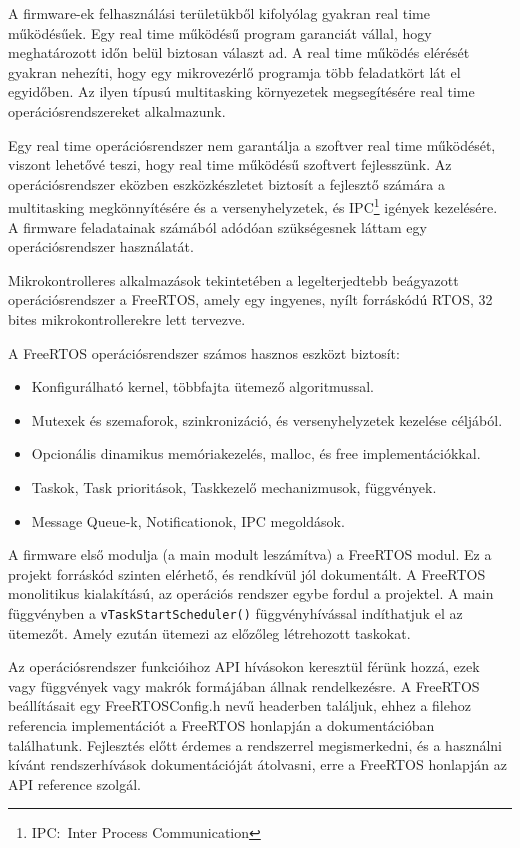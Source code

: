 A firmware-ek felhasználási területükből kifolyólag gyakran real time
működésűek. Egy real time működésű program garanciát vállal, hogy meghatározott
időn belül biztosan választ ad. A real time működés elérését gyakran
nehezíti, hogy egy mikrovezérlő programja több feladatkört lát el egyidőben. Az
ilyen típusú multitasking környezetek megsegítésére real time
operációsrendszereket alkalmazunk.

Egy real time operációsrendszer nem garantálja a szoftver real time működését,
viszont lehetővé teszi, hogy real time működésű szoftvert fejlesszünk. Az
operációsrendszer eközben eszközkészletet biztosít a fejlesztő számára
a multitasking megkönnyítésére és a versenyhelyzetek, és IPC\footnote{IPC:~Inter
Process Communication} igények kezelésére. A firmware feladatainak
számából adódóan szükségesnek láttam egy operációsrendszer használatát.

Mikrokontrolleres alkalmazások tekintetében a legelterjedtebb beágyazott
operációsrendszer a FreeRTOS, amely egy ingyenes, nyílt forráskódú RTOS, 32 bites
mikrokontrollerekre lett tervezve.

A FreeRTOS operációsrendszer számos hasznos eszközt biztosít:

\begin{itemize}
\item{Konfigurálható kernel, többfajta ütemező algoritmussal.}
\item{Mutexek és szemaforok, szinkronizáció, és versenyhelyzetek kezelése
  céljából.}
\item{Opcionális dinamikus memóriakezelés, malloc, és free implementációkkal.}
\item{Taskok, Task prioritások, Taskkezelő mechanizmusok, függvények.}
\item{Message Queue-k, Notificationok, IPC megoldások.}
\end{itemize}

A firmware első modulja (a main modult leszámítva) a FreeRTOS
modul. Ez a projekt forráskód szinten elérhető, és rendkívül jól
dokumentált. A FreeRTOS monolitikus kialakítású, az operációs rendszer
egybe fordul a projektel. A main függvényben a
\verb|vTaskStartScheduler()| függvényhívással indíthatjuk el az
ütemezőt. Amely ezután ütemezi az előzőleg létrehozott taskokat.

Az operációsrendszer funkcióihoz API hívásokon keresztül férünk hozzá,
ezek vagy függvények vagy makrók formájában állnak rendelkezésre. A
FreeRTOS beállításait egy FreeRTOSConfig.h nevű headerben találjuk,
ehhez a filehoz referencia implementációt a FreeRTOS honlapján a
dokumentációban találhatunk. Fejlesztés előtt érdemes a rendszerrel
megismerkedni, és a használni kívánt rendszerhívások dokumentációját
átolvasni, erre a FreeRTOS honlapján az API
reference\cite{FreertosApiReference} szolgál.

